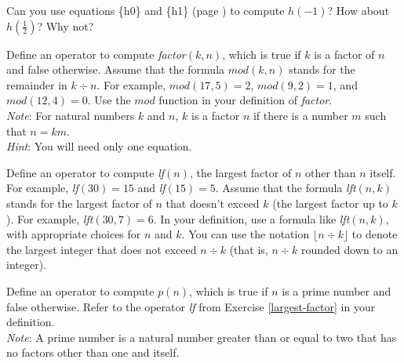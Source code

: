 \begin{ExerciseList}
\Exercise Can you use equations \{h0\} and \{h1\}
(page \pageref{reciprocalsdef})
to compute $h(-1)$?  How about $h(\frac{1}{2})$? Why not?

\Exercise Define an operator to compute \emph{factor}$(k, n)$, which is true
if $k$ is a factor of $n$ and false otherwise.
Assume that the formula $mod(k,n)$ stands for the remainder
in $k \div n$.
For example, $mod(17,5)=2$, $mod(9,2)=1$, and $mod(12,4)=0$.
Use the $mod$ function in your definition of \emph{factor}.\\
\emph{Note}: For natural numbers $k$ and $n$, $k$ is a factor $n$
if there is a number $m$ such that $n = km$.\\
\emph{Hint}: You will need only one equation.

\Exercise \label{largest-factor}
        Define an operator to compute \emph{lf}$(n)$,
        the largest factor of $n$ other than $n$ itself.
        For example, \emph{lf}$(30)=15$ and
        \emph{lf}$(15)=5$.
        Assume that the formula
        \emph{lft}$(n,k)$ stands for the largest factor of
        $n$ that doesn't exceed $k$ (the largest factor up to $k$).
        For example, \emph{lft}$(30,7)=6$.
        In your definition, use a formula like \emph{lft}$(n,k)$,
        with appropriate choices for $n$ and $k$.
        You can use the notation $\lfloor n \div k\rfloor$
        to denote the largest integer that does not exceed $n \div k$
        (that is, $n \div k$ rounded down to an integer).

\Exercise \label{prime-predicate}
        Define an operator to compute $p(n)$, which is true
        if $n$ is a prime number and false otherwise.
        Refer to the operator \emph{lf}
        from Exercise \ref{largest-factor} in your definition.\\
        \emph{Note}: A prime number is a natural number greater than or equal to two
        that has no factors other than one and itself.


\end{ExerciseList}
